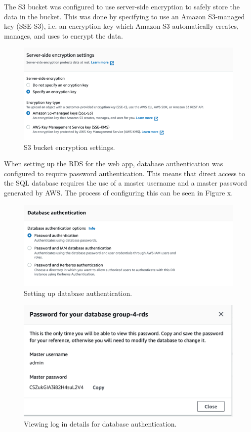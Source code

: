 The S3 bucket was configured to use server-side encryption to safely store the data in the bucket.
This was done by specifying to use an Amazon S3-managed key (SSE-S3), i.e. an encryption key which Amazon S3
automatically creates, manages, and uses to encrypt the data.

\begin{figure}[!htbp]
    \centering
    \includegraphics[width=\textwidth]{resources/s3_encryption}
    \caption{S3 bucket encryption settings.}
    \label{fig:s3-encryption}
\end{figure}

When setting up the RDS for the web app, database authentication was configured to require password authentication.
This means that direct access to the SQL database requires the use of a master username and a master password generated
by AWS.
The process of configuring this can be seen in Figure x.

\begin{figure}[!htbp]
    \centering
    \includegraphics[width=\textwidth]{resources/rds_authentication}
    \caption{Setting up database authentication.}
    \label{fig:setup-rds-auth}
\end{figure}

\begin{figure}[!htbp]
    \centering
    \includegraphics[width=\textwidth]{resources/RDS_password}
    \caption{Viewing log in details for database authentication.}
    \label{fig:view-rds-auth}
\end{figure}

